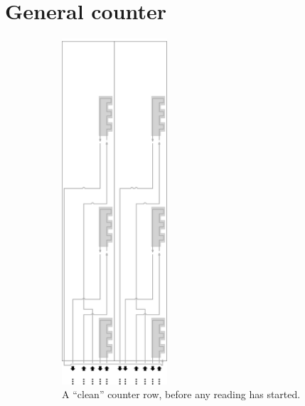 
\section{General counter}


\begin{figure}[H]
    \centering
    \begin{subfigure}[t]{0.43\textwidth}
        \centering
        \includegraphics[width=0.43\textwidth]{counter_read_start_general_case3_middle_level}
        \caption{\label{fig:counter_read_start_case3_middle_level} A ``clean'' counter row, before any reading has started.}
    \end{subfigure}%
    ~
    \begin{subfigure}[t]{0.43\textwidth}
        \centering

\end{subfigure}
\end{figure}
